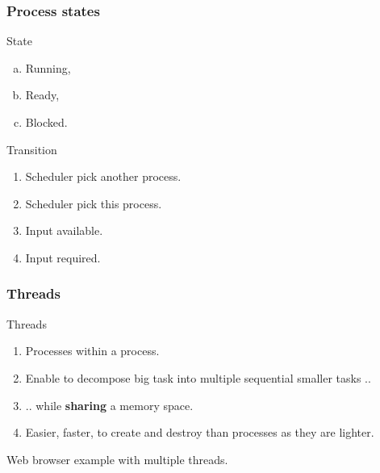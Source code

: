   \begin{frame}
    \frametitle{Process states}
        \begin{block}{State}
          \begin{enumerate}[a.]
            \item Running,
            \item Ready,
            \item Blocked.
          \end{enumerate}
        \end{block}
        \begin{block}{Transition}
          \begin{enumerate}[1.]
            \item Scheduler pick another process.
            \item Scheduler pick this process.
            \item Input available.
            \item Input required.
          \end{enumerate}
        \end{block}
  \end{frame}

  \begin{frame}
    \frametitle{Threads}
        \begin{block}{Threads}
          \begin{enumerate}
            \item Processes within a process.
            \item Enable to decompose big task into multiple sequential smaller tasks ..
            \item .. while \textbf{sharing} a memory space.
            \item Easier, faster, to create and destroy than processes as they are lighter.
          \end{enumerate}
        \end{block}
	Web browser example with multiple threads.
  \end{frame}
